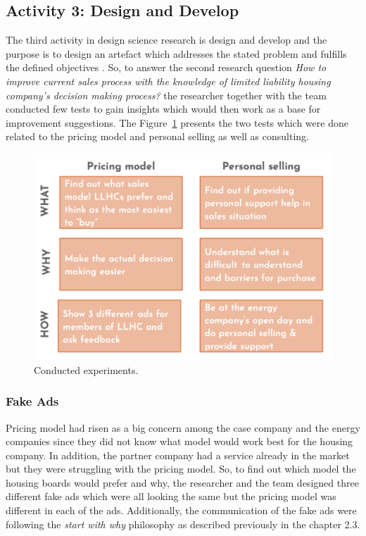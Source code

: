 \subsection{Activity 3: Design and Develop}

The third activity in design science research is design and develop and the purpose is to design an artefact which addresses the stated problem and fulfills the defined objectives \parencite{Johannesson:2014}. So, to answer the second research question \emph{How to improve current sales process with the knowledge of limited liability housing company’s decision making process?} the researcher together with the team conducted few tests to gain insights which would then work as a base for improvement suggestions. The Figure~\ref{fig:experiments} presents the two tests which were done related to the pricing model and personal selling as well as consulting.

\begin{figure}[ht]
  \begin{center}
    \includegraphics[width=\textwidth]{dippa/images/experiments.png}
    \caption{Conducted experiments.}
    \label{fig:experiments}
  \end{center}
\end{figure}

\subsubsection*{Fake Ads}

Pricing model had risen as a big concern among the case company and the energy companies since they did not know what model would work best for the housing company. In addition, the partner company had a service already in the market but they were struggling with the pricing model. So, to find out which model the housing boards would prefer and why, the researcher and the team designed three different fake ads which were all looking the same but the pricing model was different in each of the ads. Additionally, the communication of the fake ads were following the \emph{start with why} philosophy as described previously in the chapter 2.3.

